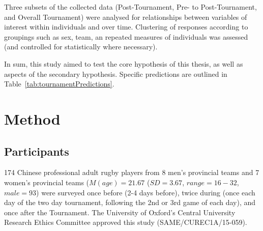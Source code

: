 \begin{CJK}{UTF8}{gbsn}
Three subsets of the collected data (Post-Tournament, Pre- to Post-Tournament, and Overall Tournament) were analysed for relationships between variables of interest within individuals and over time.  Clustering of responses according to groupings such as sex, team, an repeated measures of individuals was assessed (and controlled for statistically where necessary).

In sum, this study aimed to test the core hypothesis of this thesis, as well as aspects of the secondary hypothesis.  Specific predictions are outlined in Table~\ref{tab:tournamentPredictions}.









\clearpage

\section{Method}
\subsection{Participants}
174 Chinese professional adult rugby players from 8 men's provincial teams and 7 women's provincial teams ($M(age) = 21.67$ ($SD = 3.67$, $range = 16 - 32$, $male = 93$) were surveyed once before (2-4 days before), twice during (once each day of the two day tournament, following the 2nd or 3rd game of each day), and once after the Tournament.  The University of Oxford's Central University Research Ethics Committee approved this study (SAME/CUREC1A/15-059).


\end{CJK}
